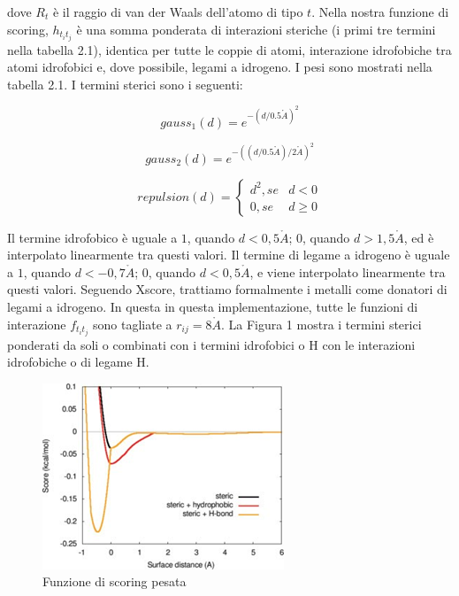 dove $R_t$ è il raggio di van der Waals dell'atomo di tipo $t$.\newline
Nella nostra funzione di scoring, $h_{t_it_j}$ è una somma ponderata di interazioni steriche (i primi tre termini nella tabella 2.1), identica per tutte le coppie di atomi, interazione idrofobiche tra atomi idrofobici e, dove possibile, legami a idrogeno. I pesi sono mostrati nella tabella 2.1. I termini sterici sono i seguenti:

\begin{equation}
    gauss_1(d)=e^{-(d/0.5\mathring{A})^2}
\end{equation}

\begin{equation}
    gauss_2(d)=e^{-((d/0.5\mathring{A})/2\mathring{A})^2}
\end{equation}

\begin{equation}
    repulsion(d) = \begin{cases}
                        d^2, se & d < 0\\
                        0, se & d \geq 0
                    \end{cases}
\end{equation}

Il termine idrofobico è uguale a $1$, quando $d < 0,5\mathring{A}$; $0$, quando $d > 1,5\mathring{A}$, ed è interpolato linearmente tra questi valori. Il termine di legame a idrogeno è uguale a $1$, quando $d < -0,7\mathring{A}$; $0$, quando $d < 0,5\mathring{A}$, e viene interpolato linearmente tra questi valori. Seguendo Xscore, trattiamo formalmente i metalli come donatori di legami a idrogeno. In questa in questa implementazione, tutte le funzioni di interazione $ f_{t_it_j}$ sono tagliate a $r_{ij} = 8\mathring{A}$.\newline
La Figura 1 mostra i termini sterici ponderati da soli o combinati con i termini idrofobici o H
con le interazioni idrofobiche o di legame H\cite{trott2010autodock}.

\begin{figure}[H]
    \centering
    \includegraphics{immagini/funzioneScoringPesata.png}
    \caption{Funzione di scoring pesata}
    \label{fig:Funzione di scoring pesata}
\end{figure}

